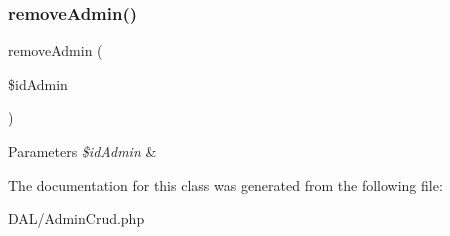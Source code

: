 \subsubsection{\texorpdfstring{removeAdmin()}{removeAdmin()}}
{\footnotesize\ttfamily remove\+Admin (\begin{DoxyParamCaption}\item[{}]{\$id\+Admin }\end{DoxyParamCaption})}


\begin{DoxyParams}{Parameters}
{\em \$id\+Admin} & \\
\hline
\end{DoxyParams}


The documentation for this class was generated from the following file\+:\begin{DoxyCompactItemize}
\item 
D\+A\+L/Admin\+Crud.\+php\end{DoxyCompactItemize}
